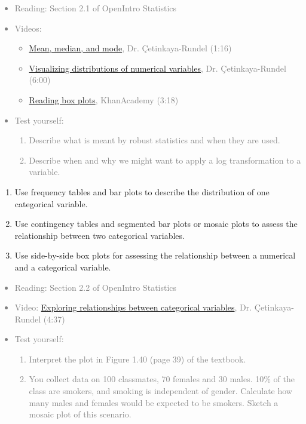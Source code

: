 \documentclass[11pt]{article}
\newcommand{\gray}[1]{\textcolor{gray}{#1}}
\begin{document}
\gray{
{\it
\vspace{-0.75cm}
\begin{itemize}
\renewcommand{\labelitemi}{{\textcolor{dark}{$\ast$}}}
\item Reading: Section 2.1 of OpenIntro Statistics
\item Videos:
\begin{itemize}
\item \href{http://youtu.be/FUIJruaneIc}{Mean, median, and mode}, Dr. \c{C}etinkaya-Rundel (1:16)
\item \href{http://youtu.be/ME_k8JY58f4}{Visualizing distributions of numerical variables}, Dr. \c{C}etinkaya-Rundel (6:00)
\item \href{http://www.khanacademy.org/math/statistics/v/reading-box-and-whisker-plots}{Reading box plots}, KhanAcademy (3:18)
\end{itemize}
\item Test yourself: 
\begin{enumerate}
\item Describe what is meant by robust statistics and when they are used.
\item Describe when and why we might want to apply a log transformation to a variable. \\
\end{enumerate}
\end{itemize}
}}


%

\begin{enumerate}[resume]
\renewcommand\labelenumi{\textcolor{light}{\textbf{LO \theenumi.}}}
\item Use frequency tables and bar plots to describe the distribution of one categorical variable.
\item Use contingency tables and segmented bar plots or mosaic plots to assess the relationship between two categorical variables.
\item Use side-by-side box plots for assessing the relationship between a numerical and a categorical variable.
\end{enumerate}

\gray{
{\it
\vspace{-0.75cm}
\begin{itemize}
\renewcommand{\labelitemi}{{\textcolor{dark}{$\ast$}}}
\item Reading: Section 2.2 of OpenIntro Statistics
\item Video: \href{http://youtu.be/zLHunbpH5Hg}{Exploring relationships between categorical variables}, Dr. \c{C}etinkaya-Rundel (4:37)
\item Test yourself: 
\begin{enumerate}
\item Interpret the plot in Figure 1.40 (page 39) of the textbook.
\item You collect data on 100 classmates, 70 females and 30 males. 10\% of the class are smokers, and smoking is independent of gender. Calculate how many males and females would be expected to be smokers. Sketch a mosaic plot of this scenario. \\
\end{enumerate}
\end{itemize}
}}
\end{document}
